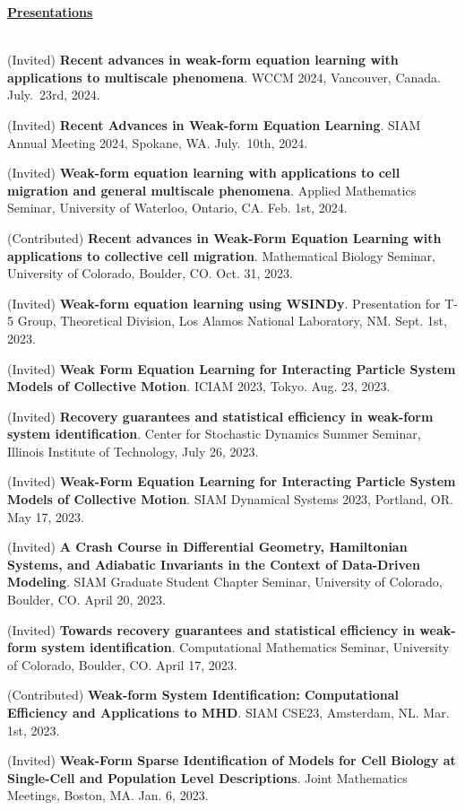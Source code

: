 \documentclass[letterpaper,11pt,oneside]{article}
\newcommand{\headr}[1]{\vspace{10pt}\uline{\Large{\textbf{#1}} \hfill } \\ \vspace{-10pt}\\}
\begin{document}
\headr{Presentations}
\vspace{-0.5cm}
\begin{enumerate}[label={[\arabic*]}]
\item (Invited) \textbf{Recent advances in weak-form equation learning
with applications to multiscale phenomena}. WCCM 2024, Vancouver, Canada. July.\ 23rd, 2024.
\item (Invited) \textbf{Recent Advances in Weak-form Equation Learning}. SIAM Annual Meeting 2024, Spokane, WA. July.\ 10th, 2024.
\item (Invited) \textbf{Weak-form equation learning with applications to cell migration and general multiscale phenomena}. Applied Mathematics Seminar, University of Waterloo, Ontario, CA. Feb. 1st, 2024.
\item (Contributed) \textbf{Recent advances in Weak-Form Equation Learning with
applications to collective cell migration}. Mathematical Biology Seminar, University of Colorado, Boulder, CO. Oct. 31, 2023.
\item (Invited) \textbf{Weak-form equation learning using WSINDy}. Presentation for T-5 Group, Theoretical Division, Los Alamos National Laboratory, NM. Sept. 1st, 2023.
\item (Invited) \textbf{Weak Form Equation Learning for Interacting Particle System
Models of Collective Motion}. ICIAM 2023, Tokyo. Aug. 23, 2023.
\item (Invited) \textbf{Recovery guarantees and statistical efficiency in weak-form
system identification}. Center for Stochastic Dynamics Summer Seminar, Illinois Institute of Technology, July 26, 2023.
\item (Invited) \textbf{Weak-Form Equation Learning for Interacting Particle System Models of Collective Motion}. SIAM Dynamical Systems 2023, Portland, OR. May 17, 2023.
\item (Invited) \textbf{A Crash Course in Differential Geometry, Hamiltonian Systems, and Adiabatic Invariants in the Context of Data-Driven Modeling}. SIAM Graduate Student Chapter Seminar, University of Colorado, Boulder, CO. April 20, 2023.
\item (Invited) \textbf{Towards recovery guarantees and statistical efficiency in weak-form system identification}. Computational Mathematics Seminar, University of Colorado, Boulder, CO. April 17, 2023.
\item (Contributed) \textbf{Weak-form System Identification: Computational Efficiency and Applications to MHD}. SIAM CSE23, Amsterdam, NL. Mar. 1st, 2023.
\item (Invited) \textbf{Weak-Form Sparse Identification of Models for Cell Biology at Single-Cell and Population Level Descriptions}. Joint Mathematics Meetings, Boston, MA. Jan. 6, 2023.

\end{enumerate}
\end{document}
